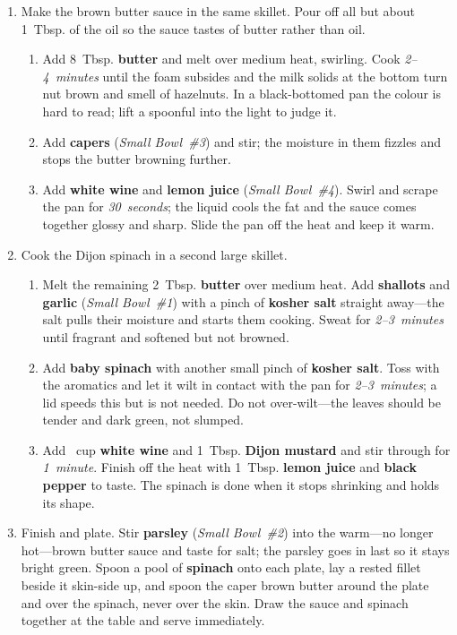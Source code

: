 \documentclass[11pt,letterpaper]{article}
\begin{document}
\begin{enumerate}
    \item Make the brown butter sauce in the same skillet. Pour off all but about 1~Tbsp. of the oil so the sauce tastes of butter rather than oil.
\begin{enumerate}
    \item Add 8~Tbsp. \textbf{butter} and melt over medium heat, swirling. Cook \textit{2--4~minutes} until the foam subsides and the milk solids at the bottom turn nut brown and smell of hazelnuts. In a black-bottomed pan the colour is hard to read; lift a spoonful into the light to judge it.
    \item Add \textbf{capers} (\textit{Small Bowl~\#3}) and stir; the moisture in them fizzles and stops the butter browning further.
    \item Add \textbf{white wine} and \textbf{lemon juice} (\textit{Small Bowl~\#4}). Swirl and scrape the pan for \textit{30~seconds}; the liquid cools the fat and the sauce comes together glossy and sharp. Slide the pan off the heat and keep it warm.
\end{enumerate}

    \item Cook the Dijon spinach in a second large skillet.
\begin{enumerate}
    \item Melt the remaining 2~Tbsp. \textbf{butter} over medium heat. Add \textbf{shallots} and \textbf{garlic} (\textit{Small Bowl~\#1}) with a pinch of \textbf{kosher salt} straight away---the salt pulls their moisture and starts them cooking. Sweat for \textit{2--3~minutes} until fragrant and softened but not browned.
    \item Add \textbf{baby spinach} with another small pinch of \textbf{kosher salt}. Toss with the aromatics and let it wilt in contact with the pan for \textit{2--3~minutes}; a lid speeds this but is not needed. Do not over-wilt---the leaves should be tender and dark green, not slumped.
    \item Add ~cup \textbf{white wine} and 1~Tbsp. \textbf{Dijon mustard} and stir through for \textit{1~minute}. Finish off the heat with 1~Tbsp. \textbf{lemon juice} and \textbf{black pepper} to taste. The spinach is done when it stops shrinking and holds its shape.

\end{enumerate}

    \item Finish and plate. Stir \textbf{parsley} (\textit{Small Bowl~\#2}) into the warm---no longer hot---brown butter sauce and taste for salt; the parsley goes in last so it stays bright green. Spoon a pool of \textbf{spinach} onto each plate, lay a rested fillet beside it skin-side up, and spoon the caper brown butter around the plate and over the spinach, never over the skin. Draw the sauce and spinach together at the table and serve immediately.
\end{enumerate}
\end{document}
